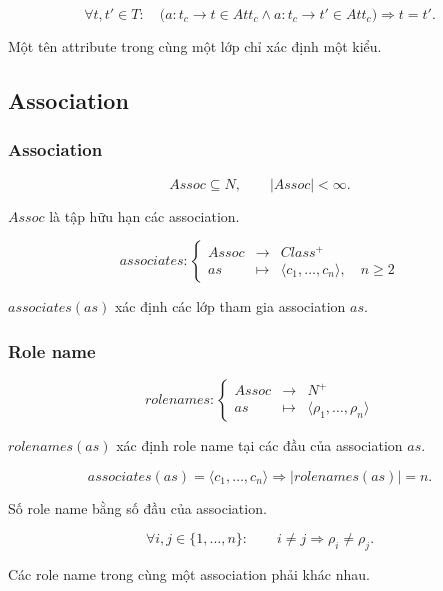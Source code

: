 \documentclass[12pt,a4paper]{article}
\theoremstyle{definition}
\begin{document}
\[
\forall t,t'\in T:
\quad
\bigl(
a:t_c\to t\in Att_c
\land
a:t_c\to t'\in Att_c
\bigr)
\Rightarrow
t=t'.
\]

Một tên attribute trong cùng một lớp chỉ xác định một kiểu.


\subsection{Association}

\subsubsection{Association}

\[
Assoc\subseteq N,
\qquad
|Assoc|<\infty.
\]

$Assoc$ là tập hữu hạn các association.

\[
associates:
\left\{
\begin{array}{rcl}
Assoc & \to & Class^{+}\\
as & \mapsto & \langle c_1,\ldots,c_n\rangle,\quad n\geq2
\end{array}
\right.
\]

$associates(as)$ xác định các lớp tham gia association $as$.


\subsubsection{Role name}

\[
rolenames:
\left\{
\begin{array}{rcl}
Assoc & \to & N^{+}\\
as & \mapsto & \langle \rho_1,\ldots,\rho_n\rangle
\end{array}
\right.
\]

$rolenames(as)$ xác định role name tại các đầu của association $as$.

\[
associates(as)=\langle c_1,\ldots,c_n\rangle
\Rightarrow
|rolenames(as)|=n.
\]

Số role name bằng số đầu của association.

\[
\forall i,j\in\{1,\ldots,n\}:
\qquad
i\neq j\Rightarrow \rho_i\neq \rho_j.
\]

Các role name trong cùng một association phải khác nhau.
\end{document}
